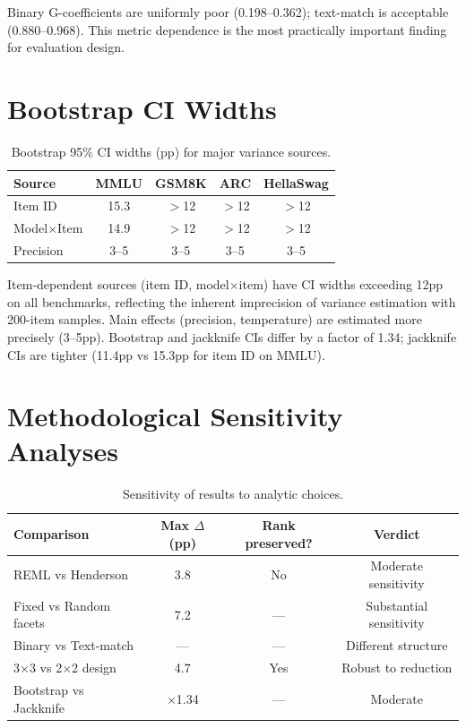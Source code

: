 \documentclass[11pt,twocolumn]{article}
\newcommand{\pct}{\%}
\begin{document}
Binary G-coefficients are uniformly poor (0.198--0.362); text-match is acceptable (0.880--0.968). This metric dependence is the most practically important finding for evaluation design.

\section{Bootstrap CI Widths}
\label{app:ci}

\begin{table}[h]
\centering
\caption{Bootstrap 95\pct{} CI widths (pp) for major variance sources.}
\label{tab:ci_widths}
\begin{tabular}{@{}lcccc@{}}
\toprule
\textbf{Source} & \textbf{MMLU} & \textbf{GSM8K} & \textbf{ARC} & \textbf{HellaSwag} \\
\midrule
Item ID         & 15.3 & $>$12 & $>$12 & $>$12 \\
Model$\times$Item & 14.9 & $>$12 & $>$12 & $>$12 \\
Precision       &  3--5 & 3--5 & 3--5 & 3--5 \\
\bottomrule
\end{tabular}
\end{table}

Item-dependent sources (item ID, model$\times$item) have CI widths exceeding 12pp on all benchmarks, reflecting the inherent imprecision of variance estimation with 200-item samples. Main effects (precision, temperature) are estimated more precisely (3--5pp). Bootstrap and jackknife CIs differ by a factor of 1.34; jackknife CIs are tighter (11.4pp vs 15.3pp for item ID on MMLU).

\section{Methodological Sensitivity Analyses}
\label{app:sensitivity}

\begin{table}[h]
\centering
\caption{Sensitivity of results to analytic choices.}
\label{tab:sensitivity}
\begin{tabular}{@{}lccc@{}}
\toprule
\textbf{Comparison} & \textbf{Max $\Delta$ (pp)} & \textbf{Rank preserved?} & \textbf{Verdict} \\
\midrule
REML vs Henderson       & 3.8 & No  & Moderate sensitivity \\
Fixed vs Random facets  & 7.2 & --- & Substantial sensitivity \\
Binary vs Text-match    & --- & --- & Different structure \\
3$\times$3 vs 2$\times$2 design & 4.7 & Yes & Robust to reduction \\
Bootstrap vs Jackknife  & $\times$1.34 & --- & Moderate \\
\bottomrule
\end{tabular}
\end{table}
\end{document}
